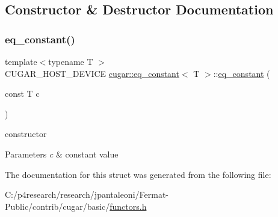 \subsection{Constructor \& Destructor Documentation}
\mbox{\label{structcugar_1_1eq__constant_a0686bf3d41fa61faba5c4c231fbc5cc0}} 
\subsubsection{\texorpdfstring{eq\+\_\+constant()}{eq\_constant()}}
{\footnotesize\ttfamily template$<$typename T $>$ \\
C\+U\+G\+A\+R\+\_\+\+H\+O\+S\+T\+\_\+\+D\+E\+V\+I\+CE \hyperlink{structcugar_1_1eq__constant}{cugar\+::eq\+\_\+constant}$<$ T $>$\+::\hyperlink{structcugar_1_1eq__constant}{eq\+\_\+constant} (\begin{DoxyParamCaption}\item[{const T}]{c }\end{DoxyParamCaption})\hspace{0.3cm}{\ttfamily [inline]}}

constructor


\begin{DoxyParams}{Parameters}
{\em c} & constant value \\
\hline
\end{DoxyParams}


The documentation for this struct was generated from the following file\+:\begin{DoxyCompactItemize}
\item 
C\+:/p4research/research/jpantaleoni/\+Fermat-\/\+Public/contrib/cugar/basic/\hyperlink{functors_8h}{functors.\+h}\end{DoxyCompactItemize}

